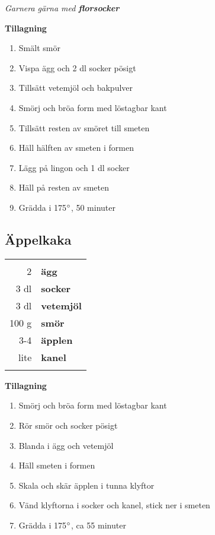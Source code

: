 \documentclass[a4paper,12pt]{article}
\newcommand{\garn}[1]{\noindent \textit{Garnera gärna med \textbf{#1}}}
\begin{document}
\garn{florsocker}

\begin{multicols*}{2}

\noindent \textbf{Tillagning}
\begin{enumerate}
	\itemsep0cm
	\item Smält smör
	\item Vispa ägg och 2 dl socker pösigt
	\item Tillsätt vetemjöl och bakpulver
	\item Smörj och bröa form med löstagbar kant
	\item Tillsätt resten av smöret till smeten
	\item Häll hälften av smeten i formen
	\item Lägg på lingon och 1 dl socker
	\item Häll på resten av smeten
	\item Grädda i 175$\degree$, 50 minuter
\end{enumerate}

\end{multicols*}

\clearpage

\subsection{Äppelkaka}

\begin{table}[H]
	\begin{tabular}{rl}
	\hline
	&\\
		2 & \textbf{ägg}\\
		3 dl & \textbf{socker}\\
		3 dl & \textbf{vetemjöl}\\
		100 g & \textbf{smör}\\
		3-4 & \textbf{äpplen}\\
		lite & \textbf{kanel}\\
	&\\
	\hline
	\end{tabular}
\end{table}

\begin{multicols*}{2}

\noindent \textbf{Tillagning}
\begin{enumerate}
	\itemsep0cm
	\item Smörj och bröa form med löstagbar kant
	\item Rör smör och socker pösigt
	\item Blanda i ägg och vetemjöl
	\item Häll smeten i formen
	\item Skala och skär äpplen i tunna klyftor
	\item Vänd klyftorna i socker och \mbox{kanel}, stick ner i smeten
	\item Grädda i 175$\degree$, ca 55 minuter
\end{enumerate}

\end{multicols*}
\end{document}
